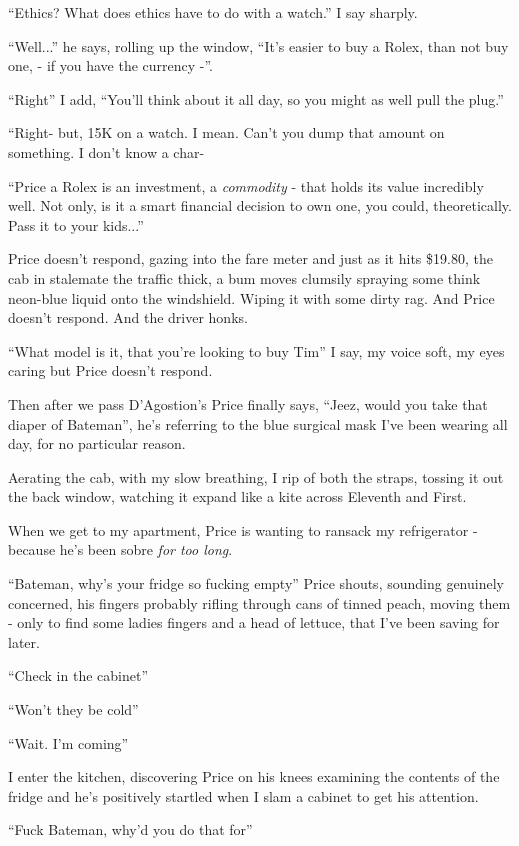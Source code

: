 \documentclass[19pt,openany]{book}
\begin{document}
``Ethics? What does ethics
have to do with a watch.'' I say
sharply.

``Well...'' he says, rolling
up the window, ``It's
easier to buy a Rolex,
than not buy one, - if you
have the currency -''.

``Right'' I add, ``You'll
think about it all day, so
you might as well pull the
plug.''

``Right- but, 15K on a watch.
I mean. Can't you dump that amount
on something. I don't
know a char-

``Price a Rolex is an investment,
a \textit{commodity} - that holds
its value incredibly well.
Not only, is it a smart
financial decision to own
one, you could, theoretically.
Pass it to your kids...''

Price doesn't respond,
gazing into the fare meter
and just as it hits \$19.80, the cab in stalemate
the traffic thick, a bum moves clumsily
spraying some think neon-blue liquid onto the windshield.
Wiping it with some dirty
rag. And Price doesn't respond. And the driver honks.

``What model is it, that you're
looking to buy Tim'' I say,
my voice soft, my eyes caring
but Price doesn't respond.

Then after we pass
D'Agostion's Price
finally says, ``Jeez, would you take that
diaper of Bateman'', he's
referring to the blue surgical
mask I've been wearing all day,
for no particular reason.

Aerating the cab,
with my slow breathing,
I rip of both the straps, tossing
it out the
back window, watching
it expand like a kite
across Eleventh and First.


When we get to my apartment, Price
is wanting to ransack my
refrigerator - because
he's been sobre \textit{for
too long}.

``Bateman, why's your fridge so fucking empty''
Price shouts, sounding genuinely concerned, his fingers
probably rifling through cans of tinned peach,
moving them - only to find
some ladies fingers and a head of lettuce, that
I've been saving for later.

``Check in the cabinet''

``Won't they be cold''

``Wait. I'm coming''

I enter the kitchen,
discovering Price on his
knees examining the contents
of the fridge and he's positively
startled when I slam a cabinet
to get his attention.

``Fuck Bateman, why'd
you do that for''
\end{document}
